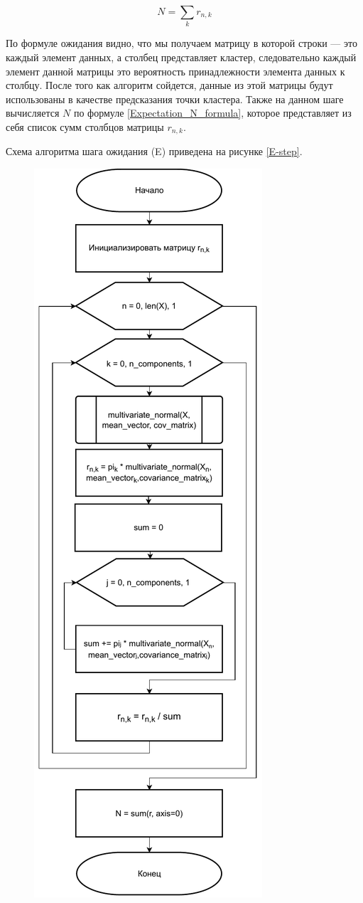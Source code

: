 \begin{equation}
\label{Expectation_N_formula}
N = \sum_{k}r_{n,k}
\end{equation}

По формуле ожидания видно, что мы получаем матрицу в которой строки --- это каждый элемент данных, а столбец представляет кластер, следовательно каждый элемент данной матрицы это вероятность принадлежности элемента данных к столбцу. После того как алгоритм сойдется, данные из этой матрицы будут использованы в качестве предсказания точки кластера. Также на данном шаге вычисляется $N$ по формуле \ref{Expectation_N_formula}, которое представляет из себя список сумм столбцов матрицы $r_{n,k}$.

Схема алгоритма шага ожидания (E) приведена на рисунке \ref{E-step}.

\begin{figure}[H]
	\centering
	\includegraphics[scale=0.8]{img/E-step.pdf}

\end{figure}
